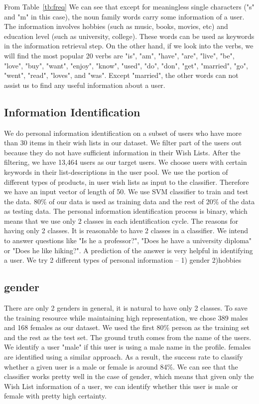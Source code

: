\documentclass{llncs}
\begin{document}
From Table~\ref{tb:freq} We can see that except for meaningless single characters ("s" and "m" in this case), the noun family words carry some information of a user. The information involves hobbies (such as music, books, movies, etc) and education level (such as university, college). These words can be used as keywords in the information retrieval step. On the other hand, if we look into the verbs, we will find the most popular 20 verbs are "is",  "am",  "have",  "are",  "live",  "be",  "love",  "buy",  "want",  "enjoy",  "know",  "used",  "do",  "don",  "get",  "married",  "go",  "went",  "read",  "loves",  and "was". Except "married", the other words can not assist us to find any useful information about a user.
\subsection{Information Identification}
We do personal information identification on a subset of users who have more than 30 items in their wish lists in our dataset. We filter part of the users out because they do not have sufficient information in their Wish Lists. After the filtering, we have 13,464 users as our target users. We choose users with certain keywords in their list-descriptions in the user pool. We use the portion of different types of products,  in user wish lists as input to the classifier. Therefore we have an input vector of length of 50. We use SVM classifier to train and test the data. 80\% of our data is used as training data and the rest of 20\% of the data as testing data. The personal information identification process is binary, which means that we use only 2 classes in each identification cycle. The reasons for having only 2 classes. It is reasonable to have 2 classes in a classifier. We intend to answer questions like "Is he a professor?", "Does he have a university diploma" or "Does he like hiking?". A prediction of the answer is very helpful in identifying a user. We try 2 different types of personal information -- 1) gender 2)hobbies

\subsection{gender}
There are only 2 genders in general, it is natural to have only 2 classes. To save the training resource while maintaining high representation, we chose 389 males and 168 females as our dataset. We used the first 80\% person as the training set and the rest as the test set. The ground truth comes from the name of the users. We identify a user "male" if this user is using a male name in the profile. females are identified using a similar approach. As a result, the success rate to classify whether a given user is a male or female is around 84\%.
We can see that the classifier works pretty well in the case of gender, which means that given only the Wish List information of a user, we can identify whether this user is male or female with pretty high certainty.
\end{document}
